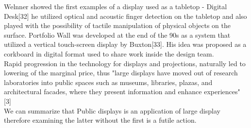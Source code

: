 Welnner showed the first examples of a display used as a tabletop -  Digital Desk[32] he utilized optical and acoustic finger detection on the tabletop and also played with the possibility of tactile manipulation of physical objects on the surface. Portfolio Wall was developed at the end of the 90s as a system that utilized a vertical touch-screen display by Buxton[33]. His idea was proposed as a corkboard in digital format used to share work inside the design team.\\

Rapid progression in the technology for displays and projections, naturally led to lowering of the marginal price, thus "large displays have moved out of research laboratories into public spaces such as museums, libraries, plazas, and architectural facades, where they present information and enhance experiences" [3]\\

We can summarize that Public displays is an application of large display therefore examining the latter without the first is a futile action.


